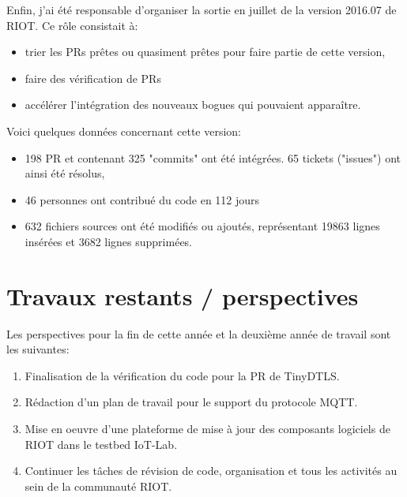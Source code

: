 \documentclass[a4paper, twoside]{article}
\newenvironment{notes}[0]{\color{blue}}{\color{black}}
\begin{document}
\begin{description}
        Enfin, j'ai été responsable d'organiser la sortie en juillet de la version
        2016.07 de RIOT. Ce rôle consistait à:
        \begin{itemize}
            \item trier les PRs prêtes ou quasiment prêtes pour faire partie de cette
                version,
            \item faire des vérification de PRs
            \item accélérer l'intégration des nouveaux bogues qui pouvaient apparaître.
        \end{itemize}
        Voici quelques données concernant cette version:
        \begin{itemize}
            \item 198 PR et contenant 325 "commits" ont été intégrées. 65 tickets
                ("issues") ont ainsi été résolus,
            \item 46 personnes ont contribué du code en 112 jours
            \item 632 fichiers sources ont été modifiés ou ajoutés, représentant 19863
                lignes insérées et 3682 lignes supprimées.
        \end{itemize}
\end{description}



\section{Travaux restants / perspectives}
Les perspectives pour la fin de cette année et la deuxième année de travail sont les suivantes:
\begin{enumerate}
	\item Finalisation de la vérification du code pour la PR de TinyDTLS.
	\item Rédaction d'un plan de travail pour le support du protocole MQTT.
	\item Mise en oeuvre d'une plateforme de mise à jour des composants logiciels de RIOT dans le testbed IoT-Lab.
	\item Continuer les tâches de révision de code, organisation et tous les activités au sein de la communauté RIOT.
\end{enumerate}
\end{document}
